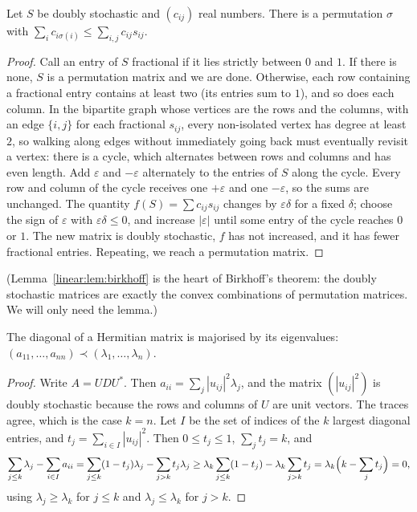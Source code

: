 \begin{lemma}\label{linear:lem:birkhoff}
Let $S$ be doubly stochastic and $(c_{ij})$ real numbers. There is a permutation $\sigma$ with $\sum_ic_{i\sigma(i)}\le
\sum_{i,j}c_{ij}s_{ij}$.
\end{lemma}
\begin{proof}
Call an entry of $S$ fractional if it lies strictly between $0$ and $1$. If there is none, $S$ is a permutation matrix and
we are done. Otherwise, each row containing a fractional entry contains at least two (its entries sum to $1$), and so does
each column. In the bipartite graph whose vertices are the rows and the columns, with an edge $\{i,j\}$ for each fractional
$s_{ij}$, every non-isolated vertex has degree at least $2$, so walking along edges without immediately going back must
eventually revisit a vertex: there is a cycle, which alternates between rows and columns and has even length. Add $\varepsilon$
and $-\varepsilon$ alternately to the entries of $S$ along the cycle. Every row and column of the cycle receives one $+\varepsilon$
and one $-\varepsilon$, so the sums are unchanged. The quantity $f(S)=\sum c_{ij}s_{ij}$ changes by $\varepsilon\delta$ for a
fixed $\delta$; choose the sign of $\varepsilon$ with $\varepsilon\delta\le0$, and increase $|\varepsilon|$ until some entry of
the cycle reaches $0$ or $1$. The new matrix is doubly stochastic, $f$ has not increased, and it has fewer fractional entries.
Repeating, we reach a permutation matrix.
\end{proof}

(Lemma~\ref{linear:lem:birkhoff} is the heart of Birkhoff's theorem: the doubly stochastic matrices are exactly the convex
combinations of permutation matrices. We will only need the lemma.)

\begin{theorem}[Schur, 1923]\label{linear:thm:schurmaj}
The diagonal of a Hermitian matrix is majorised by its eigenvalues: $(a_{11},\dots,a_{nn})\prec(\lambda_1,\dots,\lambda_n)$.
\end{theorem}
\begin{proof}
Write $A=UDU^*$. Then $a_{ii}=\sum_j|u_{ij}|^2\lambda_j$, and the matrix $(|u_{ij}|^2)$ is doubly stochastic because the rows
and columns of $U$ are unit vectors. The traces agree, which is the case $k=n$. Let $I$ be the set of indices of the $k$
largest diagonal entries, and $t_j=\sum_{i\in I}|u_{ij}|^2$. Then $0\le t_j\le1$, $\sum_jt_j=k$, and
\[
\sum_{j\le k}\lambda_j-\sum_{i\in I}a_{ii}=\sum_{j\le k}(1-t_j)\lambda_j-\sum_{j>k}t_j\lambda_j
\ge\lambda_k\sum_{j\le k}(1-t_j)-\lambda_k\sum_{j>k}t_j=\lambda_k\Bigl(k-\sum_jt_j\Bigr)=0,
\]
using $\lambda_j\ge\lambda_k$ for $j\le k$ and $\lambda_j\le\lambda_k$ for $j>k$.
\end{proof}

